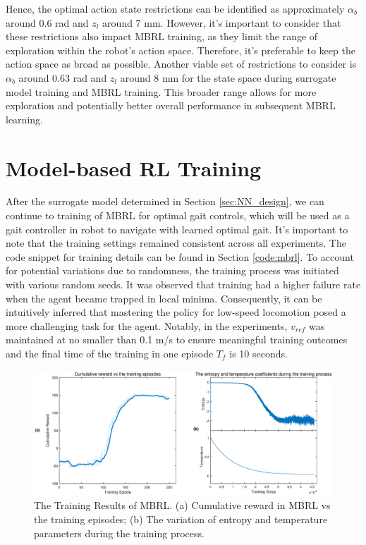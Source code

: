 Hence, the optimal action state restrictions can be identified as approximately $\alpha_b$ around 0.6 rad and $z_l$ around 7 mm. However, it's important to consider that these restrictions also impact MBRL training, as they limit the range of exploration within the robot's action space. Therefore, it's preferable to keep the action space as broad as possible. Another viable set of restrictions to consider is $\alpha_b$ around 0.63 rad and $z_l$ around 8 mm for the state space during surrogate model training and MBRL training. This broader range allows for more exploration and potentially better overall performance in subsequent MBRL learning.

\section{Model-based RL Training}
After the surrogate model determined in Section \ref{sec:NN_design}, we can continue to training of MBRL for optimal gait controls, which will be used as a gait controller in robot to navigate with learned optimal gait. It's important to note that the training settings remained consistent across all experiments. The code snippet for training details can be found in Section \ref{code:mbrl}. To account for potential variations due to randomness, the training process was initiated with various random seeds. It was observed that training had a higher failure rate when the agent became trapped in local minima. Consequently, it can be intuitively inferred that mastering the policy for low-speed locomotion posed a more challenging task for the agent. Notably, in the experiments, $v_{ref}$ was maintained at no smaller than 0.1 m/s to ensure meaningful training outcomes and the final time of the training in one episode $T_f$ is 10 seconds.
\begin{figure}[htb]
    \centering
    \includegraphics[width=\linewidth]{img/chap5/MBRL_tr.eps}
    \caption{The Training Results of MBRL. (a) Cumulative reward in MBRL vs the training episodes; (b) The variation of entropy and temperature parameters during the training process.}
    \label{fig:MBRL_tr}
\end{figure}

